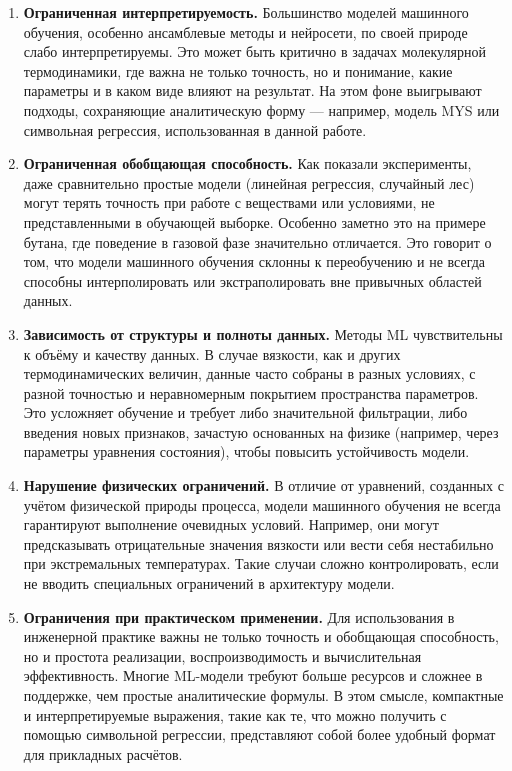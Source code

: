 \documentclass[a4paper,12pt]{article}
\begin{document}
      \begin{enumerate}
        \item \textbf{Ограниченная интерпретируемость.}
        Большинство моделей машинного обучения, особенно ансамблевые методы и нейросети, по своей природе слабо интерпретируемы. Это может быть критично в задачах молекулярной термодинамики, где важна не только точность, но и понимание, какие параметры и в каком виде влияют на результат. На этом фоне выигрывают подходы, сохраняющие аналитическую форму — например, модель MYS или символьная регрессия, использованная в данной работе.
        
        \item \textbf{Ограниченная обобщающая способность.}
        Как показали эксперименты, даже сравнительно простые модели (линейная регрессия, случайный лес) могут терять точность при работе с веществами или условиями, не представленными в обучающей выборке. Особенно заметно это на примере бутана, где поведение в газовой фазе значительно отличается. Это говорит о том, что модели машинного обучения склонны к переобучению и не всегда способны интерполировать или экстраполировать вне привычных областей данных.
        
        \item \textbf{Зависимость от структуры и полноты данных.}
        Методы ML чувствительны к объёму и качеству данных. В случае вязкости, как и других термодинамических величин, данные часто собраны в разных условиях, с разной точностью и неравномерным покрытием пространства параметров. Это усложняет обучение и требует либо значительной фильтрации, либо введения новых признаков, зачастую основанных на физике (например, через параметры уравнения состояния), чтобы повысить устойчивость модели.
        
        \item \textbf{Нарушение физических ограничений.}
        В отличие от уравнений, созданных с учётом физической природы процесса, модели машинного обучения не всегда гарантируют выполнение очевидных условий. Например, они могут предсказывать отрицательные значения вязкости или вести себя нестабильно при экстремальных температурах. Такие случаи сложно контролировать, если не вводить специальных ограничений в архитектуру модели.
        
        \item \textbf{Ограничения при практическом применении.}
        Для использования в инженерной практике важны не только точность и обобщающая способность, но и простота реализации, воспроизводимость и вычислительная эффективность. Многие ML-модели требуют больше ресурсов и сложнее в поддержке, чем простые аналитические формулы. В этом смысле, компактные и интерпретируемые выражения, такие как те, что можно получить с помощью символьной регрессии, представляют собой более удобный формат для прикладных расчётов.

      \end{enumerate}
\end{document}

